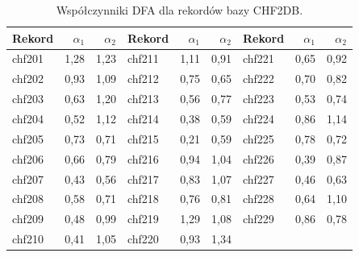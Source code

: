 \documentclass[11pt,a4paper]{article}
\begin{document}
\begin{table}[ht]
  \centering
  \small
  \caption{Współczynniki DFA dla rekordów bazy CHF2DB.}
  \label{tab:chf-all}
  \begin{tabular}{lrr|lrr|lrr}
  \toprule
  Rekord & $\alpha_1$ & $\alpha_2$ & Rekord & $\alpha_1$ & $\alpha_2$ & Rekord & $\alpha_1$ & $\alpha_2$ \\
  \midrule
  chf201 & 1,28 & 1,23 & chf211 & 1,11 & 0,91 & chf221 & 0,65 & 0,92 \\
  chf202 & 0,93 & 1,09 & chf212 & 0,75 & 0,65 & chf222 & 0,70 & 0,82 \\
  chf203 & 0,63 & 1,20 & chf213 & 0,56 & 0,77 & chf223 & 0,53 & 0,74 \\
  chf204 & 0,52 & 1,12 & chf214 & 0,38 & 0,59 & chf224 & 0,86 & 1,14 \\
  chf205 & 0,73 & 0,71 & chf215 & 0,21 & 0,59 & chf225 & 0,78 & 0,72 \\
  chf206 & 0,66 & 0,79 & chf216 & 0,94 & 1,04 & chf226 & 0,39 & 0,87 \\
  chf207 & 0,43 & 0,56 & chf217 & 0,83 & 1,07 & chf227 & 0,46 & 0,63 \\
  chf208 & 0,58 & 0,71 & chf218 & 0,76 & 0,81 & chf228 & 0,64 & 1,10 \\
  chf209 & 0,48 & 0,99 & chf219 & 1,29 & 1,08 & chf229 & 0,86 & 0,78 \\
  chf210 & 0,41 & 1,05 & chf220 & 0,93 & 1,34 &  & &  \\
  \bottomrule
  \end{tabular}
\end{table}
\end{document}
